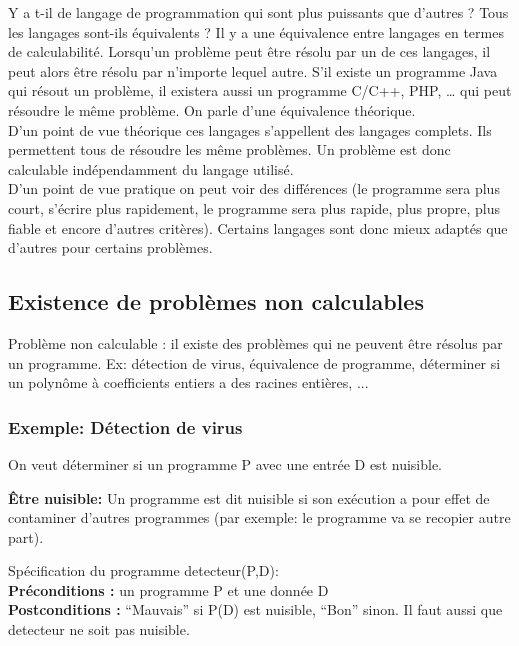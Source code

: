 Y a t-il de langage de programmation qui sont plus puissants que d'autres ? Tous les langages sont-ils équivalents ? 
\newline 
Il y a une équivalence entre langages en termes de calculabilité.  Lorsqu'un problème peut être résolu par un de ces langages, il peut alors être résolu par n'importe lequel autre.   
S'il existe un programme Java qui résout un problème, il existera aussi un programme C/C++, PHP, … qui peut résoudre le même problème. On parle d'une équivalence théorique.\\
D'un point de vue théorique ces langages s'appellent des langages complets. Ils permettent tous de résoudre les même problèmes.  Un problème est donc calculable indépendamment du langage utilisé. \\
D'un point de vue pratique on peut voir des différences (le programme sera plus court, s'écrire plus rapidement, le programme sera plus rapide, plus propre, plus fiable et encore d'autres critères).  Certains langages sont donc mieux adaptés que d'autres pour certains problèmes. 


\subsection{Existence de problèmes non calculables}
\label{subsec:existence_de_problemes_non_calculables}
	Problème non calculable : il existe des problèmes qui ne peuvent
		être résolus par un programme. Ex:
        détection de virus,
        équivalence de programme,
        déterminer si un polynôme à coefficients entiers a des racines entières, ...
	



\subsubsection{Exemple: Détection de virus}
\label{subsubsec:detection_de_virus}
On veut déterminer si un programme P avec une entrée D est nuisible.

\textbf{Être nuisible:} Un programme est dit nuisible si son exécution a pour effet de contaminer d'autres programmes (par exemple: le programme va se recopier autre part). 

Spécification du programme detecteur(P,D):\\
\textbf{Préconditions :} un programme P et une donnée D\\
\textbf{Postconditions :} ``Mauvais'' si P(D) est nuisible,
		``Bon'' sinon.
Il faut aussi que detecteur ne soit pas nuisible.

